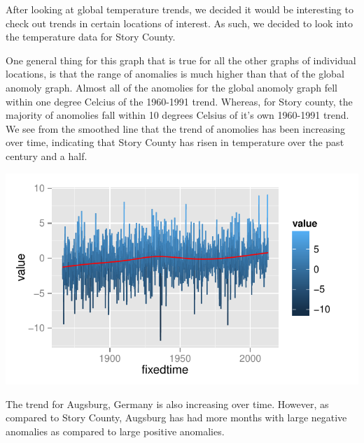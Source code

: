 \documentclass{article}\usepackage{graphicx, color}
\newenvironment{knitrout}{}{} %
\begin{document}
After looking at global temperature trends, we decided it would be interesting to check out trends in certain locations of interest. As such, we decided to look into the temperature data for Story County.

One general thing for this graph that is true for all the other graphs of individual locations, is that the range of anomalies is much higher than that of the global anomoly graph. Almost all of the anomolies for the global anomoly graph fell within one degree Celcius of the 1960-1991 trend. Whereas, for Story county, the majority of anomolies fall within 10 degrees Celsius of it's own 1960-1991 trend. We see from the smoothed line that the trend of anomolies has been increasing over time, indicating that Story County has risen in temperature over the past century and a half.


\begin{knitrout}
\color{fgcolor}\includegraphics[width=\linewidth]{figure/story-trend} 
\end{knitrout}


The trend for Augsburg, Germany is also increasing over time. However, as compared to Story County, Augsburg has had more months with large negative anomalies as compared to large positive anomalies.
\end{document}

